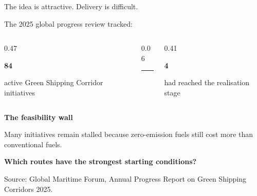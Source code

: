 \documentclass[aspectratio=169,11pt]{beamer}
\begin{document}
\begin{frame}{The idea is attractive. Delivery is difficult.}
  \vspace{0.04cm}
  {\color{Ink}\fontsize{10.8}{14}\selectfont
    The 2025 global progress review tracked:
  \par}

  \vspace{0.28cm}
  \begin{columns}[c,onlytextwidth]
    \begin{column}{0.47\textwidth}
      {\color{Ink}\fontsize{31}{35}\selectfont\bfseries 84\par}
      \vspace{0.06cm}
      {\color{Muted}\fontsize{10.3}{13.2}\selectfont
        active Green Shipping Corridor initiatives
      \par}
    \end{column}

    \begin{column}{0.06\textwidth}
      \centering
      {\color{RuleGray}\rule{0.6pt}{1.9cm}}
    \end{column}

    \begin{column}{0.41\textwidth}
      {\color{Navy}\fontsize{31}{35}\selectfont\bfseries 4\par}
      \vspace{0.06cm}
      {\color{Muted}\fontsize{10.3}{13.2}\selectfont
        had reached the realisation stage
      \par}
    \end{column}
  \end{columns}

  \vspace{0.3cm}
  {\setlength{\fboxsep}{4pt}%
    \colorbox{HighlightYellow}{%
      {\color{Ink}\fontsize{10.5}{13}\selectfont\bfseries
        The feasibility wall}%
    }\par}
  \vspace{0.12cm}
  {\color{Ink}\fontsize{11.2}{14.5}\selectfont
    Many initiatives remain stalled because zero-emission fuels still cost
    more than conventional fuels.
  \par}

  \vfill
  {\color{Navy}\fontsize{10.2}{13.2}\selectfont\bfseries
    Which routes have the strongest starting conditions?
  \par}
  \vspace{0.08cm}
  {\color{Muted}\fontsize{8.2}{10.2}\selectfont
    Source: Global Maritime Forum, Annual Progress Report on Green Shipping
    Corridors 2025.
  \par}
\end{frame}
\end{document}
